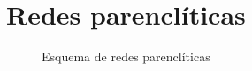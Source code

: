 \chapter{Redes parenclíticas}

\begin{figure}[htbp!]
	\label{fig:redesparencliticas}
	\begin{center}
		\resizebox{\textwidth}{!}{%
			\redesparencliticas
		}
	\end{center}
	\caption{Esquema de redes parenclíticas}
\end{figure}